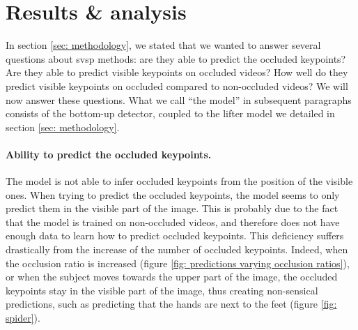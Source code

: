 \documentclass[runningheads]{llncs}
\begin{document}
\section{Results \& analysis}
In section \ref{sec: methodology}, we stated that we wanted to answer several questions about \ac{svsp} methods: are they able to predict the occluded keypoints? Are they able to predict visible keypoints on occluded videos? How well do they predict visible keypoints on occluded compared to non-occluded videos? We will now answer these questions. What we call ``the model'' in subsequent paragraphs consists of the bottom-up detector, coupled to the lifter model we detailed in section \ref{sec: methodology}.
\paragraph{Ability to predict the occluded keypoints.}
The model is not able to infer occluded keypoints from the position of the visible ones. When trying to predict the occluded keypoints, the model seems to only predict them in the visible part of the image. This is probably due to the fact that the model is trained on non-occluded videos, and therefore does not have enough data to learn how to predict occluded keypoints. This deficiency suffers drastically from the increase of the number of occluded keypoints. Indeed, when the occlusion ratio is increased (figure \ref{fig: predictions varying occlusion ratios}), or when the subject moves towards the upper part of the image, the occluded keypoints stay in the visible part of the image, thus creating non-sensical predictions, such as predicting that the hands are next to the feet (figure \ref{fig: spider}).
\end{document}
